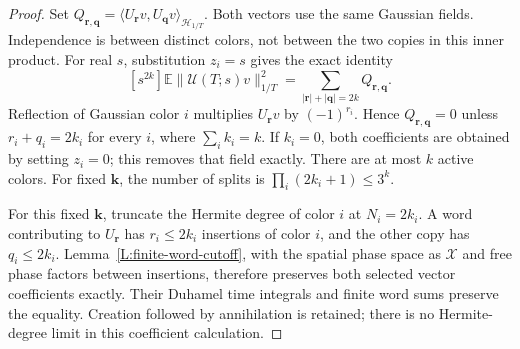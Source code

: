 \documentclass[12pt]{article}
\numberwithin{equation}{section}
\theoremstyle{definition}
\newcommand{\E}{\mathbb{E}}
\begin{document}
\begin{proof}
  Set
  $Q_{\boldsymbol r,\boldsymbol q}
  =\langle U_{\boldsymbol r}v,U_{\boldsymbol q}v
  \rangle_{\mathcal H_{1/T}}$.
  Both vectors use the same Gaussian fields. Independence is between
  distinct colors, not between the two copies in this inner product.
  For real $s$, substitution $z_i=s$ gives the exact identity
  \begin{equation}\label{E:interval-energy-splits}
    [s^{2k}]\E\|\mathcal U(T;s)v\|_{1/T}^2
    =\sum_{|\boldsymbol r|+|\boldsymbol q|=2k}
    Q_{\boldsymbol r,\boldsymbol q}.
  \end{equation}
  Reflection of Gaussian color $i$ multiplies $U_{\boldsymbol r}v$
  by $(-1)^{r_i}$. Hence $Q_{\boldsymbol r,\boldsymbol q}=0$ unless
  $r_i+q_i=2k_i$ for every $i$, where $\sum_i k_i=k$.
  If $k_i=0$, both coefficients are obtained by setting $z_i=0$;
  this removes that field exactly. There are at most $k$ active colors.
  For fixed $\boldsymbol k$, the number of splits is
  $\prod_i(2k_i+1)\le3^k$.

  For this fixed $\boldsymbol k$, truncate the Hermite degree of color $i$
  at $N_i=2k_i$. A word contributing to $U_{\boldsymbol r}$ has
  $r_i\le2k_i$ insertions of color $i$, and the other copy has
  $q_i\le2k_i$. Lemma~\ref{L:finite-word-cutoff}, with the spatial
  phase space as $\mathscr X$ and free phase factors between insertions,
  therefore preserves both selected vector coefficients exactly.
  Their Duhamel time integrals and finite word sums preserve the equality.
  Creation followed by annihilation is retained; there is no
  Hermite-degree limit in this coefficient calculation.


\end{proof}
\end{document}
